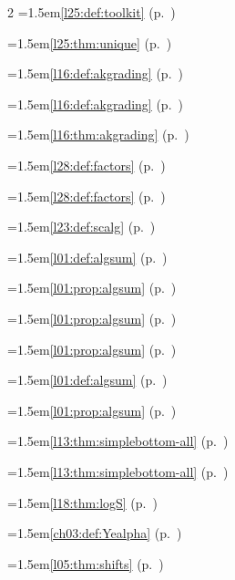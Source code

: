 \begin{multicols}{2}
\hangindent=1.5em\quad \ref{l25:def:toolkit} (p.~\pageref{l25:def:toolkit})\par
\hangindent=1.5em\quad \ref{l25:thm:unique} (p.~\pageref{l25:thm:unique})\par
\hangindent=1.5em\quad \ref{l16:def:akgrading} (p.~\pageref{l16:def:akgrading})\par
\hangindent=1.5em\quad \ref{l16:def:akgrading} (p.~\pageref{l16:def:akgrading})\par
\hangindent=1.5em\quad \ref{l16:thm:akgrading} (p.~\pageref{l16:thm:akgrading})\par
\hangindent=1.5em\quad \ref{l28:def:factors} (p.~\pageref{l28:def:factors})\par
\hangindent=1.5em\quad \ref{l28:def:factors} (p.~\pageref{l28:def:factors})\par
\hangindent=1.5em\quad \ref{l23:def:scalg} (p.~\pageref{l23:def:scalg})\par
\hangindent=1.5em\quad \ref{l01:def:algsum} (p.~\pageref{l01:def:algsum})\par
\hangindent=1.5em\quad \ref{l01:prop:algsum} (p.~\pageref{l01:prop:algsum})\par
\hangindent=1.5em\quad \ref{l01:prop:algsum} (p.~\pageref{l01:prop:algsum})\par
\hangindent=1.5em\quad \ref{l01:prop:algsum} (p.~\pageref{l01:prop:algsum})\par
\hangindent=1.5em\quad \ref{l01:def:algsum} (p.~\pageref{l01:def:algsum})\par
\hangindent=1.5em\quad \ref{l01:prop:algsum} (p.~\pageref{l01:prop:algsum})\par
\hangindent=1.5em\quad \ref{l13:thm:simplebottom-all} (p.~\pageref{l13:thm:simplebottom-all})\par
\hangindent=1.5em\quad \ref{l13:thm:simplebottom-all} (p.~\pageref{l13:thm:simplebottom-all})\par
\hangindent=1.5em\quad \ref{l18:thm:logS} (p.~\pageref{l18:thm:logS})\par
\hangindent=1.5em\quad \ref{ch03:def:Yealpha} (p.~\pageref{ch03:def:Yealpha})\par
\hangindent=1.5em\quad \ref{l05:thm:shifts} (p.~\pageref{l05:thm:shifts})\par

\end{multicols}
